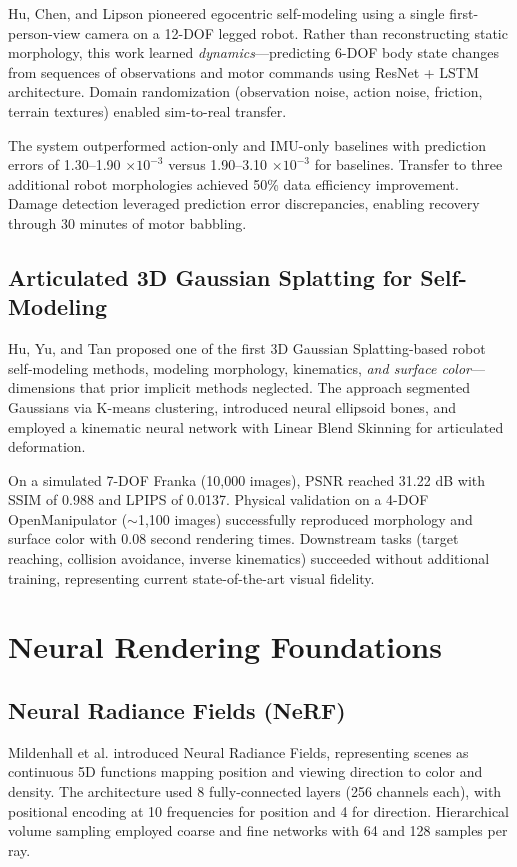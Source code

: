 \documentclass[journal]{IEEEtran}
\begin{document}
Hu, Chen, and Lipson \cite{hu2024b} pioneered egocentric self-modeling using a single first-person-view camera on a 12-DOF legged robot. Rather than reconstructing static morphology, this work learned \textit{dynamics}---predicting 6-DOF body state changes from sequences of observations and motor commands using ResNet + LSTM architecture. Domain randomization (observation noise, action noise, friction, terrain textures) enabled sim-to-real transfer.

The system outperformed action-only and IMU-only baselines with prediction errors of 1.30--1.90 $\times 10^{-3}$ versus 1.90--3.10 $\times 10^{-3}$ for baselines. Transfer to three additional robot morphologies achieved 50\% data efficiency improvement. Damage detection leveraged prediction error discrepancies, enabling recovery through 30 minutes of motor babbling.

\subsection{Articulated 3D Gaussian Splatting for Self-Modeling}

Hu, Yu, and Tan \cite{hu2025} proposed one of the first 3D Gaussian Splatting-based robot self-modeling methods, modeling morphology, kinematics, \textit{and surface color}---dimensions that prior implicit methods neglected. The approach segmented Gaussians via K-means clustering, introduced neural ellipsoid bones, and employed a kinematic neural network with Linear Blend Skinning for articulated deformation.

On a simulated 7-DOF Franka (10,000 images), PSNR reached 31.22 dB with SSIM of 0.988 and LPIPS of 0.0137. Physical validation on a 4-DOF OpenManipulator ($\sim$1,100 images) successfully reproduced morphology and surface color with 0.08 second rendering times. Downstream tasks (target reaching, collision avoidance, inverse kinematics) succeeded without additional training, representing current state-of-the-art visual fidelity.

\section{Neural Rendering Foundations}

\subsection{Neural Radiance Fields (NeRF)}

Mildenhall et al. \cite{mildenhall2020} introduced Neural Radiance Fields, representing scenes as continuous 5D functions mapping position and viewing direction to color and density. The architecture used 8 fully-connected layers (256 channels each), with positional encoding at 10 frequencies for position and 4 for direction. Hierarchical volume sampling employed coarse and fine networks with 64 and 128 samples per ray.
\end{document}
